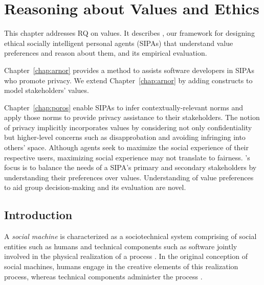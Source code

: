 \chapter{Reasoning about Values and Ethics}
\label{chap:ainur}

This chapter addresses RQ on values. It describes \frameworkAinur, our framework for 
designing ethical socially intelligent personal agents (SIPAs) that understand value preferences and
reason about them, and its empirical evaluation.

Chapter~\ref{chap:arnor} provides a method to assists software developers in SIPAs who promote privacy. We extend Chapter~\ref{chap:arnor} by adding constructs to model stakeholders' values. 

Chapter~\ref{chap:poros} enable SIPAs to infer contextually-relevant norms and apply those norms to provide privacy assistance to their stakeholders. The notion of privacy implicitly incorporates values by considering not only confidentiality but higher-level concerns such as disapprobation and avoiding infringing into others' space. 
Although \frameworkB agents seek to maximize the social experience of their respective users, maximizing social experience may not translate to fairness. 
\frameworkAinur's focus is to balance the needs of a SIPA's primary and secondary stakeholders by understanding their preferences over values. Understanding of value preferences to aid group decision-making and its evaluation are novel.



\section{Introduction}

A \emph{social machine} is characterized as a sociotechnical system comprising of social entities such as humans and technical components such as software jointly involved in the physical realization of a process \citep{Smart+14:social-machines,WWW-16:IOSE}. 
In the original conception of social machines, humans engage in the creative elements of this realization process, whereas technical components  administer the process \citep{Berners-Lee-99:Weaving}.

